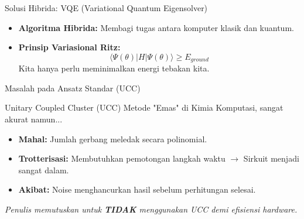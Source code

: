 \documentclass[aspectratio=169, 10pt]{beamer}
\begin{document}
\begin{frame}{Solusi Hibrida: VQE (Variational Quantum Eigensolver)}
    \begin{center}
    \end{center}

    \vspace{1em}
    \begin{itemize}
        \item \textbf{Algoritma Hibrida:} Membagi tugas antara komputer klasik dan kuantum.
        \item \textbf{Prinsip Variasional Ritz:} 
        $$ \langle \Psi(\theta) | H | \Psi(\theta) \rangle \ge E_{ground} $$
        Kita hanya perlu meminimalkan energi tebakan kita.
    \end{itemize}
\end{frame}

\begin{frame}{Masalah pada Ansatz Standar (UCC)}
    \begin{block}{Unitary Coupled Cluster (UCC)}
        Metode "Emas" di Kimia Komputasi, sangat akurat namun...
    \end{block}

    \begin{itemize}
        \item[\textbf{X}] \textbf{Mahal:} Jumlah gerbang meledak secara polinomial.
        \item[\textbf{X}] \textbf{Trotterisasi:} Membutuhkan pemotongan langkah waktu $\rightarrow$ Sirkuit menjadi sangat dalam.
        \item[\textbf{X}] \textbf{Akibat:} Noise menghancurkan hasil sebelum perhitungan selesai.
    \end{itemize}

    \vspace{1em}
    \centering
    \textit{Penulis memutuskan untuk \textbf{TIDAK} menggunakan UCC demi efisiensi hardware.}
\end{frame}
\end{document}
